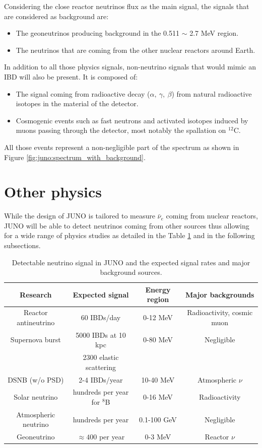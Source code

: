 \documentclass[../main.tex]{subfiles}
\begin{document}
Considering the close reactor neutrinos flux as the main signal, the signals that are considered as background are:
\begin{itemize}
  \item The geoneutrinos producing background in the 0.511 $\sim$ 2.7 MeV region.
  \item The neutrinos that are coming from the other nuclear reactors around Earth.
\end{itemize}
In addition to all those physics signals, non-neutrino signals that would mimic an IBD will also be present. It is composed of:
\begin{itemize}
  \item The signal coming from radioactive decay ($\alpha, ~ \gamma, ~ \beta$) from natural radioactive isotopes in the material of the detector.
  \item Cosmogenic events such as fast neutrons and activated isotopes induced by muons passing through the detector, most notably the spallation on $^{12}$C.
\end{itemize}
All those events represent a non-negligible part of the spectrum as shown in Figure \ref{fig:juno:spectrum_with_background}.


\section{Other physics}

While the design of JUNO is tailored to measure $\bar{\nu}_e$ coming from nuclear reactors, JUNO will be able to detect neutrinos coming from other sources thus allowing for a wide range of physics studies as detailed in the Table \ref{tab:juno:signal} and in the following subsections.

\begin{table}[ht]
\begin{center}
  \begin{tabular}{|c|c|c|c|}
    \hline Research & Expected signal & Energy region & Major backgrounds \\
    \hline Reactor antineutrino & 60 IBDs/day & 0-12 MeV  & Radioactivity, cosmic muon \\
    Supernova burst & 5000 IBDs at 10 kpc & 0-80 MeV & Negligible \\
                    & 2300 elastic scattering  & &  \\
    DSNB (w/o PSD) & 2-4 IBDs/year & 10-40 MeV & Atmospheric $\nu$ \\
    Solar neutrino & hundreds per year for $^8$B & 0-16 MeV & Radioactivity \\
    Atmospheric neutrino & hundreds per year & 0.1-100 GeV  & Negligible \\
    Geoneutrino &  $\approx 400$ per year & 0-3 MeV & Reactor $\nu$ \\
    \hline
  \end{tabular}
  \caption{Detectable neutrino signal in JUNO and the expected signal rates and major background sources.}
  \label{tab:juno:signal}
\end{center}
\end{table}
\end{document}

